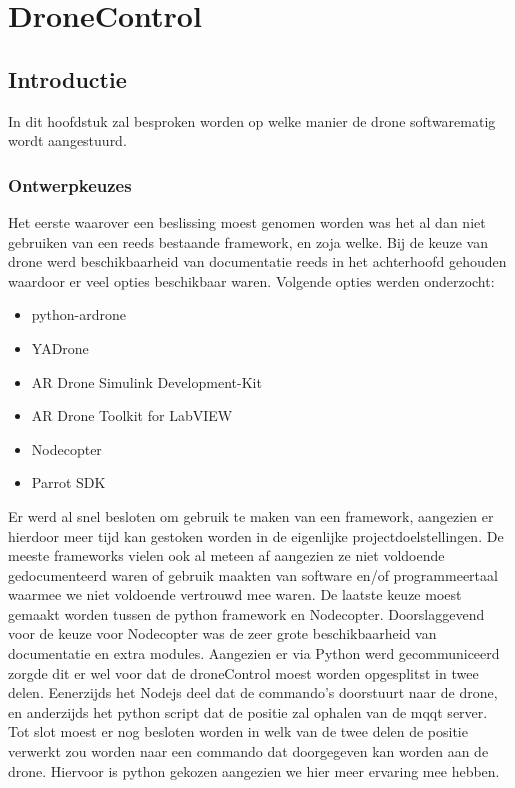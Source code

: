 \chapter{DroneControl}

\section{Introductie} \label{sec:initiele_planning}

In dit hoofdstuk zal besproken worden op welke manier de drone softwarematig wordt aangestuurd.

\subsection{Ontwerpkeuzes}

Het eerste waarover een beslissing moest genomen worden was het al dan niet gebruiken van een reeds bestaande framework, en zoja welke. Bij de keuze van drone werd beschikbaarheid van documentatie reeds in het achterhoofd gehouden waardoor er veel opties beschikbaar waren. Volgende opties werden onderzocht:

\begin{itemize}
\item python-ardrone
\item YADrone
\item AR Drone Simulink Development-Kit
\item AR Drone Toolkit for LabVIEW
\item Nodecopter
\item Parrot SDK
\end{itemize}

Er werd al snel besloten om gebruik te maken van een framework, aangezien er hierdoor meer tijd kan gestoken worden in de eigenlijke projectdoelstellingen. De meeste frameworks vielen ook al meteen af aangezien ze niet voldoende gedocumenteerd waren of gebruik maakten van software en/of programmeertaal waarmee we niet voldoende vertrouwd mee waren. De laatste keuze moest gemaakt worden tussen de python framework en Nodecopter. Doorslaggevend voor de keuze voor Nodecopter was de zeer grote beschikbaarheid van documentatie en extra modules. Aangezien er via Python werd gecommuniceerd zorgde dit er wel voor dat de droneControl moest worden opgesplitst in twee delen. Eenerzijds het Nodejs deel dat de commando's doorstuurt naar de drone, en anderzijds het python script dat de positie zal ophalen van de mqqt server. Tot slot moest er nog besloten worden in welk van de twee delen de positie verwerkt zou worden naar een commando dat doorgegeven kan worden aan de drone. Hiervoor is python gekozen aangezien we hier meer ervaring mee hebben.




